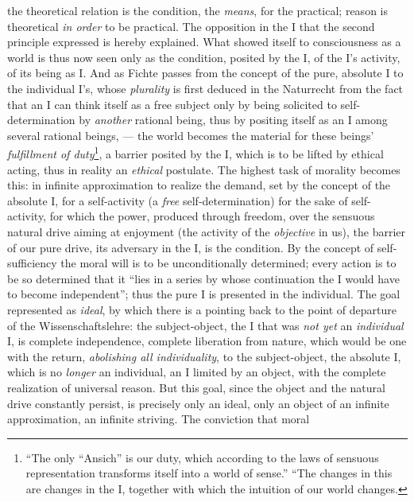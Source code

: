 the theoretical relation is the condition, the \emph{means}, for the
practical; reason is theoretical \emph{in order} to be practical. The
opposition in the I that the second principle expressed is hereby
explained. What showed itself to consciousness as a world is thus now
seen only as the condition, posited by the I, of the I's activity, of
its being as I. And as Fichte passes from the concept of the pure,
absolute I to the individual I's, whose \emph{plurality} is first
deduced in the Naturrecht from the fact that an I can think itself as a
free subject only by being solicited to self-determination by
\emph{another} rational being, thus by positing itself as an I among
several rational beings, --- the world becomes the material for these
beings' \emph{fulfillment of duty}\footnote{``The only ``Ansich'' is our
duty, which according to the laws of sensuous representation transforms
itself into a world of sense.'' ``The changes in this are changes
in the I, together with which the intuition of our world changes.
}, a barrier posited by the I, which is to be lifted by ethical acting,
thus in reality an \emph{ethical} postulate. The highest task of
morality becomes this: in infinite approximation to realize the demand,
set by the concept of the absolute I, for a self-activity (a
\emph{free} self-determination) for the sake of self-activity, for
which the power, produced through freedom, over the sensuous
natural drive aiming at enjoyment (the activity of the
\emph{objective} in us), the barrier of our pure drive, its adversary
in the I, is the condition. By the concept of self-sufficiency the
moral will is to be unconditionally determined; every action is to be
so determined that it ``lies in a series by whose continuation the I
would have to become independent''; thus the pure I is presented in the
individual. The goal represented as \emph{ideal}, by which there is a
pointing back to the point of departure of the Wissenschaftslehre: the
subject-object, the I that was \emph{not yet} an \emph{individual} I,
is complete independence, complete liberation from nature, which would
be one with the return, \emph{abolishing all individuality}, to the
subject-object, the absolute I, which is no \emph{longer} an
individual, an I limited by an object, with the complete realization of
universal reason. But this goal, since the object and the natural drive
constantly persist, is precisely only an ideal, only an object of an
infinite approximation, an infinite striving. The conviction that moral
